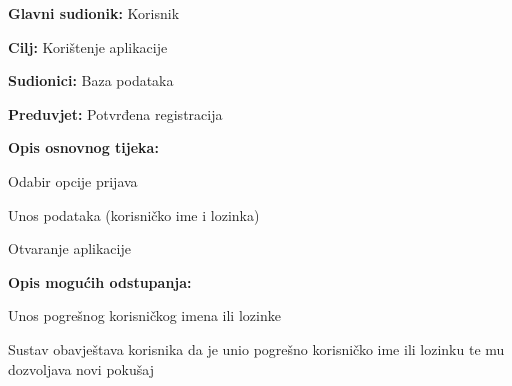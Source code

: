 					
					\noindent {}
					\begin{packed_item}
						
						\item \textbf{Glavni sudionik: }Korisnik
						\item  \textbf{Cilj:} Korištenje aplikacije
						\item  \textbf{Sudionici:} Baza podataka
						\item  \textbf{Preduvjet:} Potvrđena registracija
						\item  \textbf{Opis osnovnog tijeka:}
						
						\item[] \begin{packed_enum}
							
							\item Odabir opcije prijava
							\item Unos podataka (korisničko ime i lozinka)
							\item Otvaranje aplikacije
					
							
						\end{packed_enum}
						
						\item  \textbf{Opis mogućih odstupanja:}
						
						\item[] \begin{packed_item}
							
							\item[2.a] Unos pogrešnog korisničkog imena ili lozinke
							\item[] \begin{packed_enum}
								
								\item Sustav obavještava korisnika da je unio pogrešno korisničko ime ili lozinku te mu dozvoljava novi pokušaj
								
								\end{packed_enum}
							
						\end{packed_item}
						
					\end{packed_item}
					
